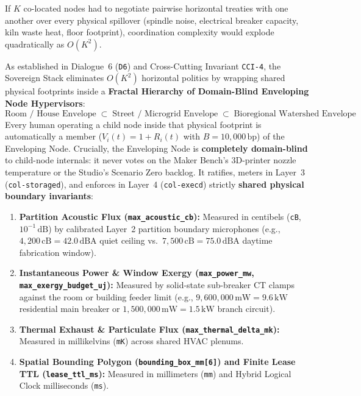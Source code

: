 If $K$ co-located nodes had to negotiate pairwise horizontal treaties with one another over every physical spillover (spindle noise, electrical breaker capacity, kiln waste heat, floor footprint), coordination complexity would explode quadratically as $O(K^2)$.

As established in Dialogue~6 (\texttt{D6}) and Cross-Cutting Invariant \texttt{CCI-4}, the Sovereign Stack eliminates $O(K^2)$ horizontal politics by wrapping shared physical footprints inside a \textbf{Fractal Hierarchy of Domain-Blind Enveloping Node Hypervisors}:
\begin{equation}
\text{Room / House Envelope} \;\subset\; \text{Street / Microgrid Envelope} \;\subset\; \text{Bioregional Watershed Envelope}
\label{eq:ch8-fractal-envelopes}
\end{equation}
Every human operating a child node inside that physical footprint is automatically a member ($V_i(t) = 1 + R_i(t)$ with $B = 10{,}000\,\mathrm{bp}$) of the Enveloping Node. Crucially, the Enveloping Node is \textbf{completely domain-blind} to child-node internals: it never votes on the Maker Bench's 3D-printer nozzle temperature or the Studio's Scenario Zero backlog. It ratifies, meters in Layer~3 (\texttt{col-storaged}), and enforces in Layer~4 (\texttt{col-execd}) strictly \textbf{shared physical boundary invariants}:
\begin{enumerate}
    \item \textbf{Partition Acoustic Flux (\texttt{max\_acoustic\_cb}):} Measured in centibels (\texttt{cB}, $10^{-1}\,\mathrm{dB}$) by calibrated Layer~2 partition boundary microphones (e.g., $4{,}200\,\mathrm{cB} = 42.0\,\mathrm{dBA}$ quiet ceiling vs.\ $7{,}500\,\mathrm{cB} = 75.0\,\mathrm{dBA}$ daytime fabrication window).
    \item \textbf{Instantaneous Power \& Window Exergy (\texttt{max\_power\_mw}, \texttt{max\_exergy\_budget\_uj}):} Measured by solid-state sub-breaker CT clamps against the room or building feeder limit (e.g., $9{,}600{,}000\,\mathrm{mW} = 9.6\,\mathrm{kW}$ residential main breaker or $1{,}500{,}000\,\mathrm{mW} = 1.5\,\mathrm{kW}$ branch circuit).
    \item \textbf{Thermal Exhaust \& Particulate Flux (\texttt{max\_thermal\_delta\_mk}):} Measured in millikelvins (\texttt{mK}) across shared HVAC plenums.
    \item \textbf{Spatial Bounding Polygon (\texttt{bounding\_box\_mm[6]}) and Finite Lease TTL (\texttt{lease\_ttl\_ms}):} Measured in millimeters (\texttt{mm}) and Hybrid Logical Clock milliseconds (\texttt{ms}).
\end{enumerate}

